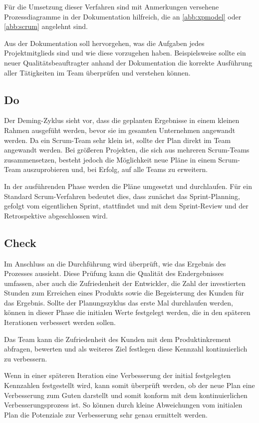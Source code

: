             Für die Umsetzung dieser Verfahren sind mit Anmerkungen versehene Prozessdiagramme in der Dokumentation hilfreich, die an \autoref{abb:xpmodel} oder \autoref{abb:scrum} angelehnt sind.

            Aus der Dokumentation soll hervorgehen, was die Aufgaben jedes Projektmitglieds sind und wie diese vorzugehen haben. Beispielsweise sollte ein neuer Qualitätsbeauftragter anhand der Dokumentation die korrekte Ausführung aller Tätigkeiten im Team überprüfen und verstehen können.

        \subsection{Do}

            Der Deming-Zyklus sieht vor, dass die geplanten Ergebnisse in einem kleinen Rahmen ausgefüht werden, bevor sie im gesamten Unternehmen angewandt werden. Da ein Scrum-Team sehr klein ist, sollte der Plan direkt im Team angewandt werden. Bei größeren Projekten, die sich aus mehreren Scrum-Teams zusammensetzen, besteht jedoch die Möglichkeit neue Pläne in einem Scrum-Team auszuprobieren und, bei Erfolg, auf alle Teams zu erweitern.

            In der ausführenden Phase werden die Pläne umgesetzt und durchlaufen. Für ein Standard Scrum-Verfahren bedeutet dies, dass zunächst das Sprint-Planning, gefolgt vom eigentlichen Sprint, stattfindet und mit dem Sprint-Review und der Retrospektive abgeschlossen wird.

        \subsection{Check}

            Im Anschluss an die Durchführung wird überprüft, wie das Ergebnis des Prozesses aussieht. Diese Prüfung kann die Qualität des Endergebnisses umfassen, aber auch die Zufriedenheit der Entwickler, die Zahl der investierten Stunden zum Erreichen eines Produkts sowie die Begeisterung des Kunden für das Ergebnis. Sollte der Planungszyklus das erste Mal durchlaufen werden, können in dieser Phase die initialen Werte festgelegt werden, die in den späteren Iterationen verbessert werden sollen.

            Das Team kann die Zufriedenheit des Kunden mit dem Produktinkrement abfragen, bewerten und als weiteres Ziel festlegen diese Kennzahl kontinuierlich zu verbessern.

            Wenn in einer späteren Iteration eine Verbesserung der initial festgelegten Kennzahlen festgestellt wird, kann somit überprüft werden, ob der neue Plan eine Verbesserung zum Guten darstellt und somit konform mit dem kontinuierlichen Verbesserungsprozess ist. So können durch kleine Abweichungen vom initialen Plan die Potenziale zur Verbesserung sehr genau ermittelt werden.

